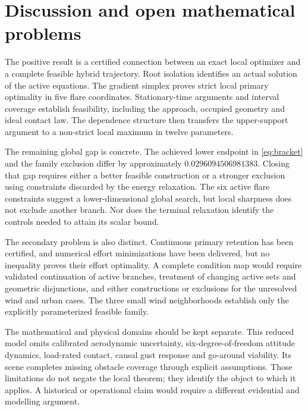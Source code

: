\section{Discussion and open mathematical problems}
The positive result is a certified connection between an exact local optimizer and a complete feasible hybrid trajectory. Root isolation identifies an actual solution of the active equations. The gradient simplex proves strict local primary optimality in five flare coordinates. Stationary-time arguments and interval coverage establish feasibility, including the approach, occupied geometry and ideal contact law. The dependence structure then transfers the upper-support argument to a non-strict local maximum in twelve parameters.

The remaining global gap is concrete. The achieved lower endpoint in \eqref{eq:bracket} and the family exclusion differ by approximately $0.0296094506981383$. Closing that gap requires either a better feasible construction or a stronger exclusion using constraints discarded by the energy relaxation. The six active flare constraints suggest a lower-dimensional global search, but local sharpness does not exclude another branch. Nor does the terminal relaxation identify the controls needed to attain its scalar bound.

The secondary problem is also distinct. Continuous primary retention has been certified, and numerical effort minimizations have been delivered, but no inequality proves their effort optimality. A complete condition map would require validated continuation of active branches, treatment of changing active sets and geometric disjunctions, and either constructions or exclusions for the unresolved wind and urban cases. The three small wind neighborhoods establish only the explicitly parameterized feasible family.

The mathematical and physical domains should be kept separate. This reduced model omits calibrated aerodynamic uncertainty, six-degree-of-freedom attitude dynamics, load-rated contact, causal gust response and go-around viability. Its scene completes missing obstacle coverage through explicit assumptions. Those limitations do not negate the local theorem; they identify the object to which it applies. A historical or operational claim would require a different evidential and modelling argument.


